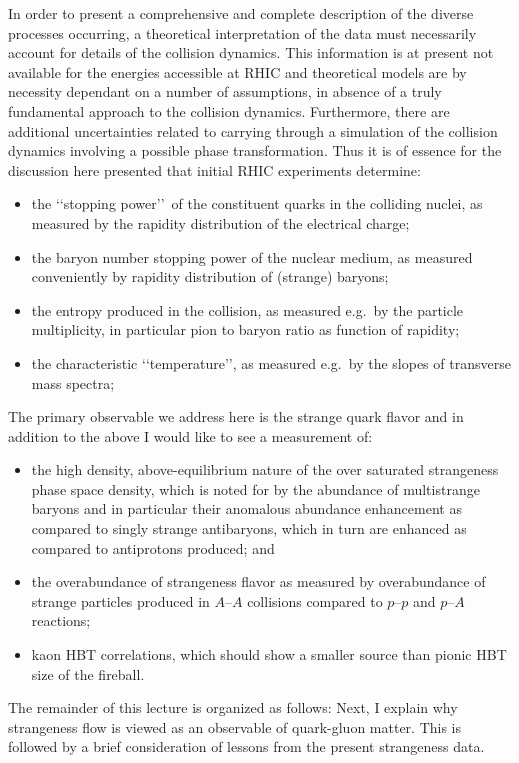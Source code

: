\begin{mdframed}[linecolor=gray,roundcorner=12pt,backgroundcolor=Dandelion!15,linewidth=1pt,leftmargin=0cm,rightmargin=0cm,topline=true,bottomline=true,skipabove=12pt]
In order to present a comprehensive and complete description of the diverse processes occurring, a theoretical interpretation of the data must necessarily account for details of the collision dynamics. This information is at present not available for the energies accessible at RHIC and theoretical models are by necessity dependant on a number of assumptions, in absence of a truly fundamental approach to the collision dynamics. Furthermore, there are additional uncertainties related to carrying through a simulation of the collision dynamics involving a possible phase transformation. Thus it is of essence for the discussion here presented that initial RHIC experiments determine:
\begin{itemize}
\item the \lq\lq stopping power\rq\rq\ of the constituent quarks in the colliding nuclei, as measured by the rapidity distribution of the electrical charge; \item the baryon number stopping power of the nuclear medium, as measured conveniently by rapidity distribution of (strange) baryons; \item the entropy produced in the collision, as measured e.g.~by the particle multiplicity, in particular pion to baryon ratio as function of rapidity; 
\item the characteristic \lq\lq temperature\rq\rq, as measured e.g.~by the slopes of transverse mass spectra;
\end{itemize}
The primary observable we address here is the strange quark flavor and in addition to the above I would like to see a measurement of:
\begin{itemize}
\item the high density, above-equilibrium nature of the over saturated strangeness phase space density, which is noted for by the abundance of multistrange baryons and in particular their anomalous abundance enhancement as compared to singly strange antibaryons, which in turn are enhanced as compared to antiprotons produced; and 
\item the overabundance of strangeness flavor as measured by overabundance of strange particles produced in $A$--$A$ collisions compared to $p$--$p$ and $p$--$A$ reactions;
\item kaon HBT correlations, which should show a smaller source than pionic HBT size of the fireball.
\end{itemize}
The remainder of this lecture is organized as follows: Next, I explain why strangeness flow is viewed as an observable of quark-gluon matter. This is followed by a brief consideration of lessons from the present strangeness data.\\[0.5cm]

\end{mdframed}
